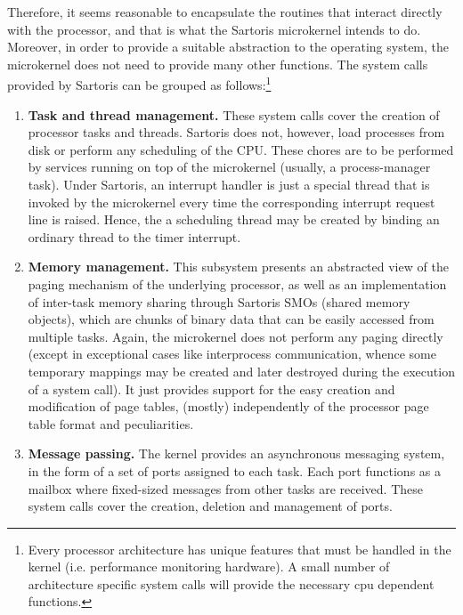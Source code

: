 \documentclass[11pt, letterpaper, twoside, english]{book}
\begin{document}
Therefore, it seems reasonable to encapsulate the routines that interact directly with the processor, and that is what the Sartoris microkernel intends to do. Moreover, in order to provide a suitable abstraction to the operating system, the microkernel does not need to provide many other functions. The system calls provided by Sartoris can be grouped as follows:\footnote{Every processor architecture has unique features that must be handled in the kernel (i.e. performance monitoring hardware). A small number of architecture specific system calls will provide the necessary cpu dependent functions. }

\begin{enumerate}
\item[]\textbf{Task and thread management.} These system calls cover the creation of processor tasks and threads. Sartoris does not, however, load processes from disk or perform any scheduling of the CPU. These chores are to be performed by services running on top of the microkernel (usually, a process-manager task). Under Sartoris, an interrupt handler is just a special thread that is invoked by the microkernel every time the corresponding interrupt request line is raised. Hence, the a scheduling thread may be created by binding an ordinary thread to the timer interrupt.
\item[]\textbf{Memory management.} This subsystem presents an abstracted view of the paging mechanism of the underlying processor, as well as an implementation of inter-task memory sharing through Sartoris SMOs (shared memory objects), which are chunks of binary data that can be easily accessed from multiple tasks. Again, the microkernel does not perform any paging directly (except in exceptional cases like interprocess communication, whence some temporary mappings may be created and later destroyed during the execution of a system call). It just provides support for the easy creation and modification of page tables, (mostly) independently of the processor page table format and peculiarities.
\item[]\textbf{Message passing.} The kernel provides an asynchronous messaging system, in the form of a set of ports assigned to each task. Each port functions as a mailbox where fixed-sized messages from other tasks are received. These system calls cover the creation, deletion and management of ports.
\end{enumerate}
\end{document}
